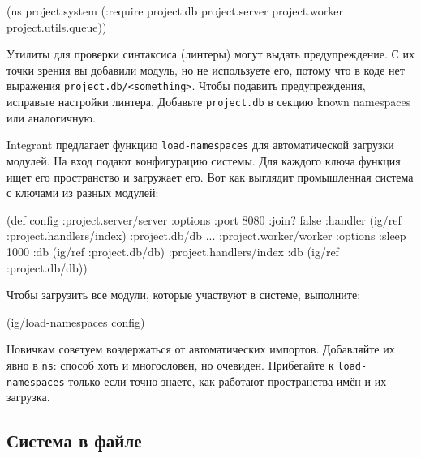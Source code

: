 \begin{english}
  \begin{clojure}
(ns project.system
  (:require project.db
            project.server
            project.worker
            project.utils.queue))
  \end{clojure}
\end{english}

Утилиты для проверки синтаксиса (линтеры) могут выдать предупреждение. С их
точки зрения вы добавили модуль, но не используете его, потому что в коде нет
выражения \verb|project.db/<something>|. Чтобы подавить предупреждения,
исправьте настройки линтера. Добавьте \verb|project.db| в секцию known
namespaces или аналогичную.


Integrant предлагает функцию \verb|load-namespaces| для автоматической загрузки
модулей. На вход подают конфигурацию системы. Для каждого ключа функция ищет его
пространство и загружает его. Вот как выглядит промышленная система с ключами из
разных модулей:

\begin{english}
  \begin{clojure}
(def config
  {:project.server/server
   {:options {:port 8080 :join? false}
    :handler (ig/ref :project.handlers/index)}
   :project.db/db {...}
   :project.worker/worker
   {:options {:sleep 1000}
    :db      (ig/ref :project.db/db)}
   :project.handlers/index
   {:db (ig/ref :project.db/db)}})
  \end{clojure}
\end{english}

\noindent
Чтобы загрузить все модули, которые участвуют в системе, выполните:

\begin{english}
  \begin{clojure}
(ig/load-namespaces config)
  \end{clojure}
\end{english}

Новичкам советуем воздержаться от автоматических импортов. Добавляйте их явно в
\verb|ns|: способ хоть и многословен, но очевиден. Прибегайте к
\verb|load-namespaces| только если точно знаете, как работают пространства
имён и их загрузка.

\subsection{Система в файле}


